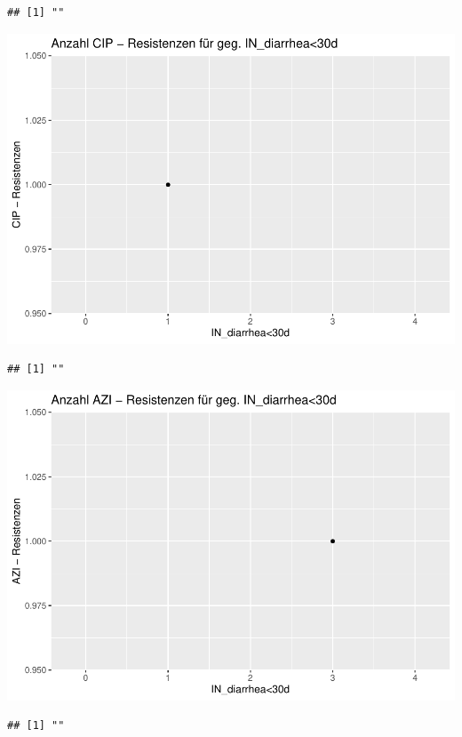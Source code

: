 \documentclass[
]{article}
\begin{document}
\begin{verbatim}
## [1] ""
\end{verbatim}

\includegraphics{NResistenzen_files/figure-latex/unnamed-chunk-6-32.pdf}

\begin{verbatim}
## [1] ""
\end{verbatim}

\includegraphics{NResistenzen_files/figure-latex/unnamed-chunk-6-33.pdf}

\begin{verbatim}
## [1] ""
\end{verbatim}
\end{document}
